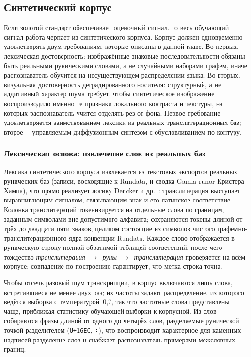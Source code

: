 \documentclass[a4paper,12pt]{extarticle}
\begin{document}
\subsection{Синтетический корпус}
\label{sec:synth}
 
Если золотой стандарт обеспечивает оценочный сигнал, то весь обучающий сигнал работа черпает из синтетического корпуса. Корпус должен одновременно удовлетворять двум требованиям, которые описаны в данной главе. Во-первых, лексическая достоверность: изображённые знаковые последовательности обязаны быть реальными руническими словами, а не случайными наборами графем, иначе распознаватель обучится на несуществующем распределении языка. Во-вторых, визуальная достоверность деградированного носителя: структурный, а не аддитивный характер шума требует, чтобы синтетическое изображение воспроизводило именно те признаки локального контраста и текстуры, на которых распознаватель учится отделять рез от фона. Первое требование удовлетворяется заимствованием лексики из реальных транслитерационных баз; второе~-- управляемым диффузионным синтезом с обусловливанием по контуру.
 
\subsubsection{Лексическая основа: извлечение слов из реальных баз}
\label{sec:synth-lexicon}
 
Лексика синтетического корпуса извлекается из текстовых экспортов реальных рунических баз (записи, восходящие к Rundata, и сводка Gamla runor Кристера Хампа), что прямо реализует логику Dencker и др.~\cite{dencker2020}: транслитерация выступает выравнивающим сигналом, связывающим знак и его латинское соответствие. Колонка транслитераций токенизируется на отдельные слова по границам, заданным символами вне допустимого алфавита; сохраняются токены длиной от трёх до двадцати пяти знаков, целиком состоящие из символов чистого графемно-транслитерационного ядра конвенции Rundata. Каждое слово отображается в руническую строку полной обратимой таблицей соответствий, после чего тождество \textit{транслитерация}~$\to$~\textit{руны}~$\to$~\textit{транслитерация} проверяется на всём корпусе: совпадение по построению гарантирует, что метка-строка точна.
 
Чтобы отсечь разовый шум транскрипции, в корпус включаются лишь слова, встретившиеся не менее двух раз; их частоты задают распределение, из которого ведётся выборка с температурой~0,7, так что частотные слова представлены чаще, приближая статистику обучающей выборки к корпусной. Из слов собираются фразы длиной от одного до четырёх слов, разделяемые рунической точкой-разделителем (\texttt{U+16EC}, ᛬), что воспроизводит характерное для каменных надписей разделение слов и снабжает распознаватель примерами межсловных границ.
 
\end{document}
